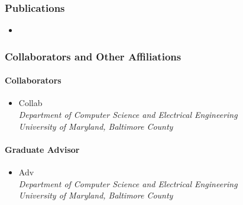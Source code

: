     \subsubsection{Publications}
      \begin{itemize}
	\item 
      \end{itemize}
    \subsubsection{Collaborators and Other Affiliations}
      \paragraph{Collaborators}
	\begin{itemize}
          \item Collab\\
            \textit{Department of Computer Science and Electrical Engineering
              \\University of Maryland, Baltimore County}
        \end{itemize}
      \paragraph{Graduate Advisor}
	\begin{itemize}
          \item Adv\\
            \textit{Department of Computer Science and Electrical Engineering
              \\University of Maryland, Baltimore County}
        \end{itemize}